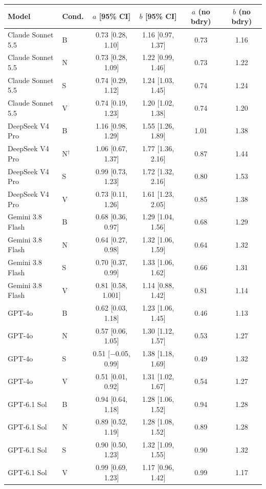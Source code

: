 \begin{tabular}{llcccc}
\toprule
Model & Cond. & $a$ [95\% CI] & $b$ [95\% CI] & $a$ (no bdry) & $b$ (no bdry) \\
\midrule
Claude Sonnet 5.5 & B & 0.73 [0.28, 1.10] & 1.16 [0.97, 1.37] & 0.73 & 1.16 \\
Claude Sonnet 5.5 & N & 0.73 [0.28, 1.09] & 1.22 [0.99, 1.46] & 0.73 & 1.22 \\
Claude Sonnet 5.5 & S & 0.74 [0.29, 1.12] & 1.24 [1.03, 1.45] & 0.74 & 1.24 \\
Claude Sonnet 5.5 & V & 0.74 [0.19, 1.23] & 1.20 [1.02, 1.38] & 0.74 & 1.20 \\
DeepSeek V4 Pro & B & 1.16 [0.98, 1.29] & 1.55 [1.26, 1.89] & 1.01 & 1.38 \\
DeepSeek V4 Pro & N$^\dagger$ & 1.06 [0.67, 1.37] & 1.77 [1.36, 2.16] & 0.87 & 1.44 \\
DeepSeek V4 Pro & S & 0.99 [0.73, 1.23] & 1.72 [1.32, 2.16] & 0.80 & 1.53 \\
DeepSeek V4 Pro & V & 0.73 [0.11, 1.26] & 1.61 [1.23, 2.05] & 0.85 & 1.38 \\
Gemini 3.8 Flash & B & 0.68 [0.36, 0.97] & 1.29 [1.04, 1.56] & 0.68 & 1.29 \\
Gemini 3.8 Flash & N & 0.64 [0.27, 0.98] & 1.32 [1.06, 1.59] & 0.64 & 1.32 \\
Gemini 3.8 Flash & S & 0.70 [0.37, 0.99] & 1.33 [1.06, 1.62] & 0.66 & 1.31 \\
Gemini 3.8 Flash & V & 0.81 [0.58, 1.001] & 1.14 [0.88, 1.42] & 0.81 & 1.14 \\
GPT-4o & B & 0.62 [0.03, 1.18] & 1.23 [1.06, 1.45] & 0.46 & 1.13 \\
GPT-4o & N & 0.57 [0.06, 1.05] & 1.30 [1.12, 1.57] & 0.53 & 1.27 \\
GPT-4o & S & 0.51 [\ensuremath{-}0.05, 0.99] & 1.38 [1.18, 1.69] & 0.49 & 1.32 \\
GPT-4o & V & 0.51 [0.01, 0.92] & 1.31 [1.02, 1.67] & 0.54 & 1.27 \\
GPT-6.1 Sol & B & 0.94 [0.64, 1.18] & 1.28 [1.06, 1.52] & 0.94 & 1.28 \\
GPT-6.1 Sol & N & 0.89 [0.52, 1.19] & 1.28 [1.08, 1.52] & 0.89 & 1.28 \\
GPT-6.1 Sol & S & 0.90 [0.50, 1.23] & 1.32 [1.09, 1.55] & 0.90 & 1.32 \\
GPT-6.1 Sol & V & 0.99 [0.69, 1.23] & 1.17 [0.96, 1.42] & 0.99 & 1.17 \\
\bottomrule
\end{tabular}

